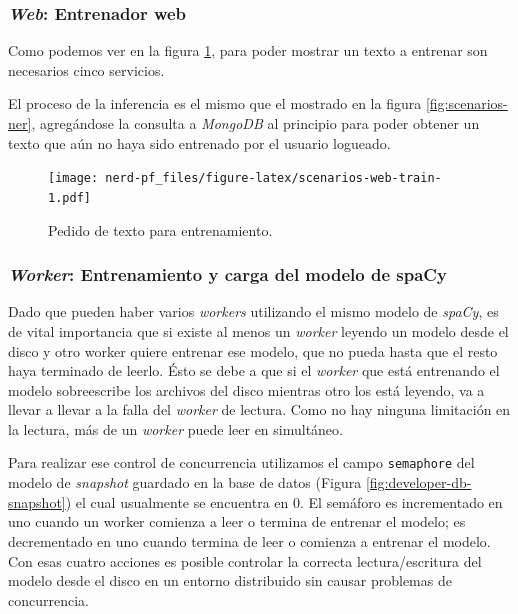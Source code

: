\documentclass[12pt,a4paper,]{scrartcl}
\begin{document}
\hypertarget{web-entrenador-web}{%
\subsubsection{\texorpdfstring{\emph{Web}: Entrenador web}{Web: Entrenador web}}\label{web-entrenador-web}}

Como podemos ver en la figura \ref{fig:scenarios-web-train}, para poder mostrar un texto a entrenar son necesarios cinco servicios.

El proceso de la inferencia es el mismo que el mostrado en la figura \ref{fig:scenarios-ner}, agregándose la consulta a \emph{MongoDB} al principio para poder obtener un texto que aún no haya sido entrenado por el usuario logueado.

\begin{figure}[H]

{\centering \texttt{[image: nerd-pf\_files/figure-latex/scenarios-web-train-1.pdf]} 

}

\caption{Pedido de texto para entrenamiento.}\label{fig:scenarios-web-train}
\end{figure}

\hypertarget{worker-entrenamiento-y-carga-del-modelo-de-spacy}{%
\subsubsection{\texorpdfstring{\emph{Worker}: Entrenamiento y carga del modelo de spaCy}{Worker: Entrenamiento y carga del modelo de spaCy}}\label{worker-entrenamiento-y-carga-del-modelo-de-spacy}}

Dado que pueden haber varios \emph{workers} utilizando el mismo modelo de \emph{spaCy}, es de vital importancia que si existe al menos un \emph{worker} leyendo un modelo desde el disco y otro worker quiere entrenar ese modelo, que no pueda hasta que el resto haya terminado de leerlo.
Ésto se debe a que si el \emph{worker} que está entrenando el modelo sobreescribe los archivos del disco mientras otro los está leyendo, va a llevar a llevar a la falla del \emph{worker} de lectura. Como no hay ninguna limitación en la lectura, más de un \emph{worker} puede leer en simultáneo.

Para realizar ese control de concurrencia utilizamos el campo \texttt{semaphore} del modelo de \emph{snapshot} guardado en la base de datos (Figura \ref{fig:developer-db-snapshot}) el cual usualmente se encuentra en \(0\). El semáforo es incrementado en uno cuando un worker comienza a leer o termina de entrenar el modelo; es decrementado en uno cuando termina de leer o comienza a entrenar el modelo. Con esas cuatro acciones es posible controlar la correcta lectura/escritura del modelo desde el disco en un entorno distribuido sin causar problemas de concurrencia.
\end{document}
